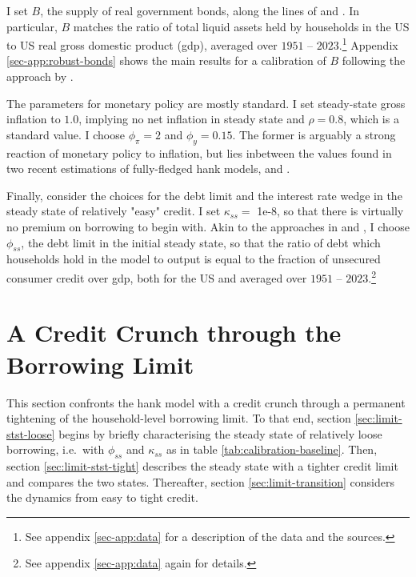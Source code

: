 \documentclass[12pt]{article} %
\numberwithin{equation}{section} %
\numberwithin{figure}{section}
\numberwithin{table}{section}
\begin{document}
I set $B$, the supply of real government bonds, along the lines of \textcite{mckay2016} and \textcite{gl2017}. In particular, $B$ matches the ratio of total liquid assets held by households in the US to US real gross domestic product (\Gls{gdp}), averaged over $1951$ -- $2023$.\footnote{See appendix \ref{sec-app:data} for a description of the data and the sources.} Appendix \ref{sec-app:robust-bonds} shows the main results for a calibration of $B$ following the approach by \textcite{bayer2023}.

The parameters for monetary policy are mostly standard. I set steady-state gross inflation to $1.0$, implying no net inflation in steady state and $\rho = 0.8$, which is a standard value. I choose $\phi_{\pi} = 2$ and $\phi_y = 0.15$. The former is arguably a strong reaction of monetary policy to inflation, but lies inbetween the values found in two recent estimations of fully-fledged \Gls{hank} models, \textcite{boehl2022} and \textcite{bayer2023}.

Finally, consider the choices for the debt limit and the interest rate wedge in the steady state of relatively "easy" credit. I set  $\kappa_{ss} = $ 1e-8, so that there is virtually no premium on borrowing to begin with. Akin to the approaches in \textcite{gl2017} and \textcite{bayer2023}, I choose $\phi_{ss}$, the debt limit in the initial steady state, so that the ratio of debt which households hold in the model to output is equal to the fraction of unsecured consumer credit over \Gls{gdp}, both for the US and averaged over $1951$ -- $2023$.\footnote{See appendix \ref{sec-app:data} again for details.} %

\section{A Credit Crunch through the Borrowing Limit}
\label{sec:limit}

This section confronts the \Gls{hank} model with a credit crunch through a permanent tightening of the household-level borrowing limit. To that end, section \ref{sec:limit-stst-loose} begins by briefly characterising the steady state of relatively loose borrowing, i.e.~with $\phi_{ss}$ and $\kappa_{ss}$ as in table \ref{tab:calibration-baseline}. Then, section \ref{sec:limit-stst-tight} describes the steady state with a tighter credit limit and compares the two states. Thereafter, section \ref{sec:limit-transition} considers the dynamics from easy to tight credit.
\end{document}
